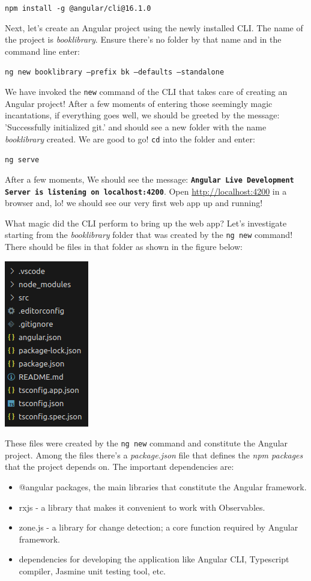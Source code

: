 \documentclass{report}
\begin{document}
\texttt{npm install -g @angular/cli@16.1.0}

Next, let's create an Angular project using the newly installed CLI. The name of the project is \textsl{booklibrary}. Ensure there's no folder by that name and in the command line enter: 

\texttt{ng new booklibrary --prefix bk --defaults --standalone}

We have invoked the \texttt{new} command of the CLI that takes care of creating an Angular project! After a few moments of entering those seemingly magic incantations, if everything goes well, we should be greeted by the message: 'Successfully initialized git.' and should see a new folder with the name \textsl{booklibrary} created. We are good to go! \texttt{cd} into the folder and enter:

\texttt{ng serve}

After a few moments, We should see the message: \textbf{\texttt{Angular Live Development Server is listening on localhost:4200}}. Open \url{http://localhost:4200} in a browser and, lo! we should see our very first web app up and running!

What magic did the CLI perform to bring up the web app? Let's investigate starting from the \textsl{booklibrary} folder that was created by the \texttt{ng new} command! There should be files in that folder as shown in the figure below:

\includegraphics[scale=0.5]{project-structure}

These files were created by the \texttt{ng new} command and constitute the Angular project. Among the files there's a \textsl{package.json} file that defines the \textsl{npm packages} that the project depends on. The important dependencies are:

\begin{itemize}
	\item @angular packages, the main libraries that constitute the Angular framework.
	\item rxjs - a library that makes it convenient to work with Observables.
	\item zone.js - a library for change detection; a core function required by Angular framework.
	\item dependencies for developing the application like Angular CLI, Typescript compiler, Jasmine unit testing tool, etc.
\end{itemize}
\end{document}
